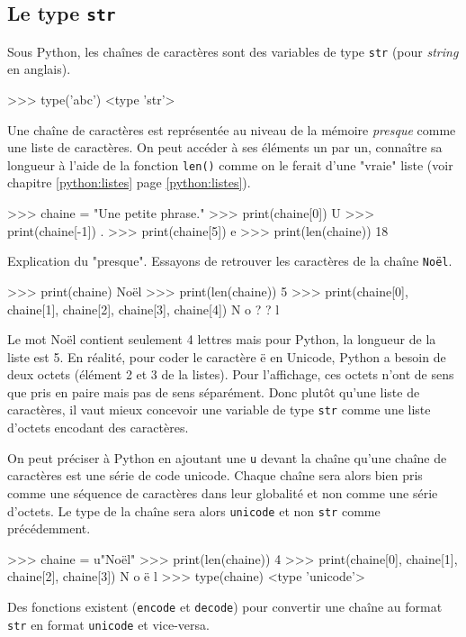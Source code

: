 \subsection{Le type \texttt{str}}

Sous Python, les chaînes de caractères sont des variables de type \texttt{str} (pour \textit{string} en anglais).
\begin{pythoncode}
>>> type('abc')
<type 'str'>
\end{pythoncode}

Une chaîne de caractères est représentée au niveau de la mémoire \textit{presque} comme une liste de caractères. On peut accéder à ses éléments un par un, connaître sa longueur à l'aide de la fonction \texttt{len()} comme on le ferait d'une "vraie" liste (voir chapitre \ref{python:listes} page \ref{python:listes}).
\begin{pythoncode}
>>> chaine = "Une petite phrase."
>>> print(chaine[0])
U
>>> print(chaine[-1])
.
>>> print(chaine[5])
e
>>> print(len(chaine))
18
\end{pythoncode}
Explication du "presque". Essayons de retrouver les caractères de la chaîne \texttt{Noël}.
\begin{pythoncode}
>>> print(chaine)
Noël
>>> print(len(chaine))
5
>>> print(chaine[0], chaine[1], chaine[2], chaine[3], chaine[4])
N o ? ? l
\end{pythoncode}
Le mot \textsf{Noël} contient seulement 4 lettres mais pour Python, la longueur de la liste est 5. En réalité, pour coder le caractère \textsf{ë} en Unicode, Python a besoin de deux octets (élément 2 et 3 de la listes). Pour l'affichage, ces octets n'ont de sens que pris en paire mais pas de sens séparément. Donc plutôt qu'une liste de caractères, il vaut mieux concevoir une variable de type \texttt{str} comme une liste d'octets encodant des caractères.

On peut préciser à Python en ajoutant une \texttt{u} devant la chaîne qu'une chaîne de caractères est une série de code unicode. Chaque chaîne sera alors bien pris comme une séquence de caractères dans leur globalité et non comme une série d'octets. Le type de la chaîne sera alors \texttt{unicode} et non \texttt{str} comme précédemment.
\begin{pythoncode}
>>> chaine = u"Noël"
>>> print(len(chaine))
4
>>> print(chaine[0], chaine[1], chaine[2], chaine[3])
N o ë l
>>> type(chaine)
<type 'unicode'>
\end{pythoncode}
Des fonctions existent (\texttt{encode} et \texttt{decode}) pour convertir une chaîne au format \texttt{str} en format \texttt{unicode} et vice-versa.

